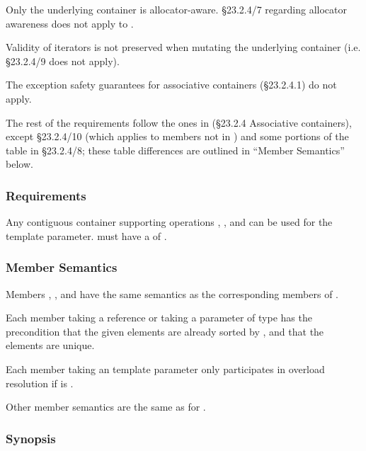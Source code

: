 Only the underlying container is allocator-aware.  \S23.2.4/7 regarding
allocator awareness does not apply to .

Validity of iterators is not preserved when mutating the underlying container
(i.e. \S23.2.4/9 does not apply).

The exception safety guarantees for associative containers (\S23.2.4.1) do not
apply.

The rest of the requirements follow the ones in (\S23.2.4 Associative
containers), except \S23.2.4/10 (which applies to members not in
) and some portions of the table in \S23.2.4/8; these table
differences are outlined in ``Member Semantics'' below.

\subsubsection{ Requirements}

Any contiguous container supporting operations ,
, and  can be used for the
 template parameter.   must have a
 of .

\subsubsection{Member Semantics}

Members , , and  have
the same semantics as the corresponding members of .

Each member taking a  reference or taking a parameter of type
 has the precondition that the given
elements are already sorted by , and that the elements are
unique.

Each member taking an  template parameter only participates in
overload resolution if  is
.

Other member semantics are the same as for .

\subsubsection{ Synopsis}


